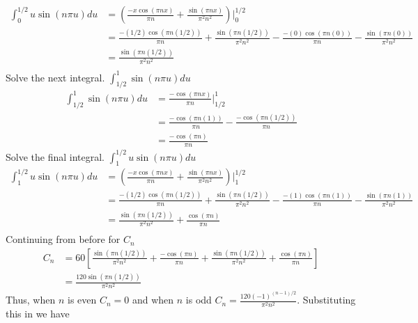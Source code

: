 \begin{align*}
    \int_{0}^{1/2} u\sin\left(n\pi u\right) du
    &= \left(
    \frac{-x\cos(\pi n x)}{\pi n} + 
    \frac{\sin(\pi n x)}{\pi^2 n^2}
    \right)\Bigg|_0^{1/2}\\
    &= \frac{-(1/2)\cos(\pi n (1/2))}{\pi n } + 
    \frac{\sin(\pi n (1/2))}{\pi^2 n^2} - \frac{-(0)\cos(\pi n (0))}{\pi n} - \frac{\sin(\pi n (0))}{\pi^2 n^2} \\
    &= \frac{\sin(\pi n (1/2))}{\pi^2 n^2} \\
\end{align*}
Solve the next integral. $\displaystyle \int_{1/2}^{1} \sin\left(n\pi u\right) du$
\begin{align*}
    \int_{1/2}^{1} \sin\left(n\pi u\right) du
    &= \frac{-\cos(\pi n x)}{\pi n}\Bigg|_{1/2}^{1}\\
    &= \frac{-\cos(\pi n (1))}{\pi n} - \frac{-\cos(\pi n (1/2))}{\pi n} \\
    &= \frac{-\cos(\pi n)}{\pi n}
\end{align*}
Solve the final integral. $\displaystyle \int_{1}^{1/2} u\sin\left(n\pi u\right) du$
\begin{align*}
    \int_{1}^{1/2} u\sin\left(n\pi u\right) du
    &= \left(
    \frac{-x\cos(\pi n x)}{\pi n} + 
    \frac{\sin(\pi n x)}{\pi^2 n^2}
    \right)\Bigg|_1^{1/2}\\
    &= \frac{-(1/2)\cos(\pi n (1/2))}{\pi n} + 
    \frac{\sin(\pi n (1/2))}{\pi^2 n^2} - \frac{-(1)\cos(\pi n (1))}{\pi n} - \frac{\sin(\pi n (1))}{\pi^2 n^2} \\
    &= \frac{\sin(\pi n (1/2))}{\pi^2 n^2} + \frac{\cos(\pi n)}{\pi n}\\
\end{align*}
Continuing from before for $C_n$
\begin{align*}
    C_n
    &= 60
    \left[
    \frac{\sin(\pi n (1/2))}{\pi^2 n^2} +\frac{-\cos(\pi n)}{\pi n} +\frac{\sin(\pi n (1/2))}{\pi^2 n^2} + \frac{\cos(\pi n)}{\pi n}
    \right]\\
    &= \frac{120\sin(\pi n (1/2))}{\pi^2 n^2}
\end{align*}
Thus, when $n$ is even $C_n = 0$ and when $n$ is odd $C_n = \frac{120(-1)^{(n-1)/2}}{\pi^2 n^2}$.
Substituting this in we have
\answer{\[
    T(x,y) = \frac{120}{\pi^2}\sum_{\substack{n = 1 \\ \text{odd } n}}^{\infty} \frac{(-1)^{(n-1)/2}}{n^2} \sin\left(\frac{n\pi}{30} x\right) e^{-\frac{n\pi}{30}y}
\]}